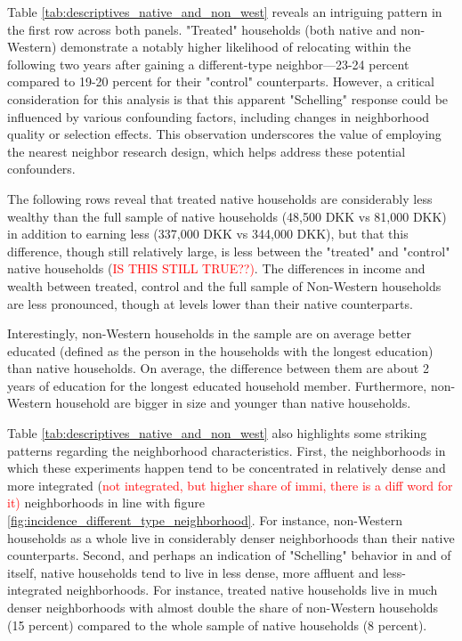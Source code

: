 \documentclass[main.tex]{subfiles}
\begin{document}
Table \ref{tab:descriptives_native_and_non_west} reveals an intriguing pattern in the first row across both panels. "Treated" households (both native and non-Western) demonstrate a notably higher likelihood of relocating within the following two years after gaining a different-type neighbor—23-24 percent compared to 19-20 percent for their "control" counterparts. However, a critical consideration for this analysis is that this apparent "Schelling" response could be influenced by various confounding factors, including changes in neighborhood quality or selection effects. This observation underscores the value of employing the nearest neighbor research design, which helps address these potential confounders.

The following rows reveal that treated native households are considerably less wealthy than the full sample of native households (48,500 DKK vs 81,000 DKK) in addition to earning less (337,000 DKK vs 344,000 DKK), but that this difference, though still relatively large, is less between the "treated" and "control" native households (\textcolor{red}{IS THIS STILL TRUE??)}. The differences in income and wealth between treated, control and the full sample of Non-Western households are less pronounced, though at levels lower than their native counterparts.

Interestingly, non-Western households in the sample are on average better educated (defined as the person in the households with the longest education) than native households. On average, the difference between them are about 2 years of education for the longest educated household member. Furthermore, non-Western household are bigger in size and younger than native households. 

Table \ref{tab:descriptives_native_and_non_west} also highlights some striking patterns regarding the neighborhood characteristics. First, the neighborhoods in which these experiments happen tend to be concentrated in relatively dense and more integrated (\textcolor{red}{not integrated, but higher share of immi, there is a diff word for it)} neighborhoods in line with figure \ref{fig:incidence_different_type_neighborhood}. For instance, non-Western households as a whole live in considerably denser neighborhoods than their native counterparts. Second, and perhaps an indication of "Schelling" behavior in and of itself, native households tend to live in less dense, more affluent and less-integrated neighborhoods. For instance, treated native households live in much denser neighborhoods with almost double the share of non-Western households (15 percent) compared to the whole sample of native households (8 percent). 
\end{document}
